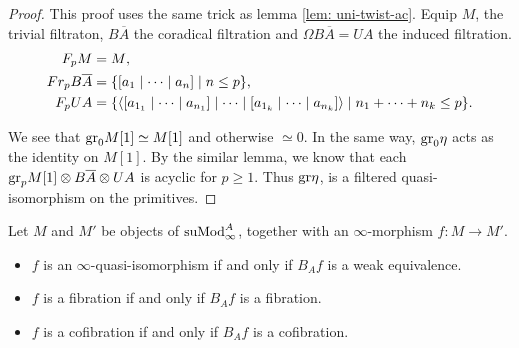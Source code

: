 \documentclass[../thesis.tex]{subfiles}
\begin{document}
            \begin{proof}
                This proof uses the same trick as lemma \ref{lem: uni-twist-ac}. Equip $M$, the trivial filtraton, $B\overline{A}$ the coradical filtration and $\Omega B\overline{A} = UA$ the induced filtration.
                \begin{align*}
                    F_pM & = M\tt{,} \\
                    Fr_pB\overline{A} & = \startset{[a_1 \mid \cdots \mid a_n] \mid n \leq p}\tt{,} \\
                    F_p UA & = \startset{\langle [a_{1_1} \mid \cdots \mid a_{n_1}] \mid \cdots \mid [a_{1_k} \mid \cdots \mid a_{n_k}] \rangle \mid n_1 + \cdots + n_k \leq p}\tt{.}
                \end{align*} 

                We see that $\tt{gr}_0M[1] \simeq M[1]$ and otherwise $\simeq 0$. In the same way, $\tt{gr}_0\eta$ acts as the identity on $M[1]$. By the similar lemma, we know that each $\tt{gr}_p M[1] \otimes B\overline{A} \otimes UA$ is acyclic for $p \geq 1$. Thus $\tt{gr}\eta$, is a filtered quasi-isomorphism on the primitives.

            \end{proof}

            \begin{proposition}
                Let $M$ and $M'$ be objects of $\tt{suMod}_\infty^A$, together with an $\infty$-morphism $f : M \to M'$.
                \begin{itemize}
                    \item $f$ is an $\infty$-quasi-isomorphism if and only if $B_Af$ is a weak equivalence.
                    \item $f$ is a fibration if and only if $B_Af$ is a fibration.
                    \item $f$ is a cofibration if and only if $B_Af$ is a cofibration.
                \end{itemize}
            \end{proposition}
\end{document}
